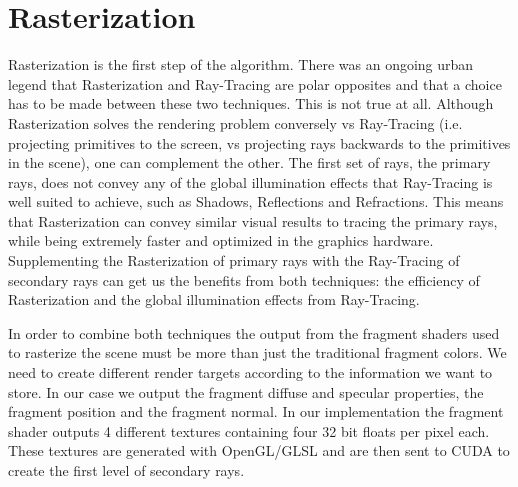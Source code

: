 \section{Rasterization}
\label{section:algorithm-rasterization}

Rasterization is the first step of the algorithm. There was an ongoing urban legend that Rasterization and Ray-Tracing are polar opposites and that a choice has to be made between these two techniques. This is not true at all. Although Rasterization solves the rendering problem conversely vs Ray-Tracing (i.e. projecting primitives to the screen, vs projecting rays backwards to the primitives in the scene), one can complement the other. 
The first set of rays, the primary rays, does not convey any of the global illumination effects that Ray-Tracing is well suited to achieve, such as Shadows, Reflections and Refractions. This means that Rasterization can convey similar visual results to tracing the primary rays, while being extremely faster and optimized in the graphics hardware. Supplementing the Rasterization of primary rays with the Ray-Tracing of secondary rays can get us the benefits from both techniques: the efficiency of Rasterization and the global illumination effects from Ray-Tracing.

\medskip

In order to combine both techniques the output from the fragment shaders used to rasterize the scene must be more than just the traditional fragment colors. We need to create different render targets according to the information we want to store. In our case we output the fragment diffuse and specular properties, the fragment position and the fragment normal. In our implementation the fragment shader outputs 4 different textures containing four 32 bit floats per pixel each. These textures are generated with OpenGL/GLSL and are then sent to CUDA to create the first level of secondary rays.

\medskip

